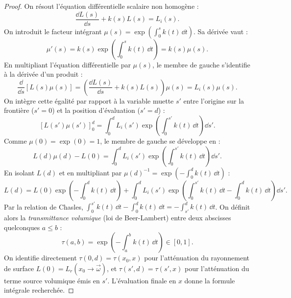 \begin{proof}
    On résout l'équation différentielle scalaire non homogène :
    \begin{equation}
        \frac{\dd L(s)}{\dd s} + k(s) L(s) = L_i(s).
    \end{equation}
    On introduit le facteur intégrant $\mu(s) = \exp\left( \int_0^s k(t) \, \dd t \right)$. Sa dérivée vaut :
    \begin{equation}
        \mu'(s) = k(s) \exp\left( \int_0^s k(t) \, \dd t \right) = k(s) \mu(s).
    \end{equation}
    En multipliant l'équation différentielle par $\mu(s)$, le membre de gauche s'identifie à la dérivée d'un produit :
    \begin{equation}
        \frac{\dd}{\dd s} \left[ L(s) \mu(s) \right] = \left( \frac{\dd L(s)}{\dd s} + k(s) L(s) \right) \mu(s) = L_i(s) \mu(s).
    \end{equation}
    On intègre cette égalité par rapport à la variable muette $s'$ entre l'origine sur la frontière ($s'=0$) et la position d'évaluation ($s'=d$) :
    \begin{equation}
        \left[ L(s') \mu(s') \right]_0^d = \int_0^d L_i(s') \exp\left( \int_0^{s'} k(t) \, \dd t \right) \dd s'.
    \end{equation}
    Comme $\mu(0) = \exp(0) = 1$, le membre de gauche se développe en :
    \begin{equation}
        L(d) \mu(d) - L(0) = \int_0^d L_i(s') \exp\left( \int_0^{s'} k(t) \, \dd t \right) \dd s'.
    \end{equation}
    En isolant $L(d)$ et en multipliant par $\mu(d)^{-1} = \exp\left( -\int_0^d k(t) \, \dd t \right)$ :
    \begin{equation}
        L(d) = L(0) \exp\left( -\int_0^d k(t) \, \dd t \right) + \int_0^d L_i(s') \exp\left( \int_0^{s'} k(t) \, \dd t - \int_0^d k(t) \, \dd t \right) \dd s'.
    \end{equation}
    Par la relation de Chasles, $\int_0^{s'} k(t) \, \dd t - \int_0^d k(t) \, \dd t = -\int_{s'}^d k(t) \, \dd t$. On définit alors la \emph{transmittance volumique} (loi de Beer-Lambert) entre deux abscisses quelconques $a \leqslant b$ :
    \begin{equation}
        \tau(a, b) = \exp\left( -\int_a^b k(t) \, \dd t \right) \in [0, 1].
    \end{equation}
    On identifie directement $\tau(0, d) = \tau(x_0, x)$ pour l'atténuation du rayonnement de surface $L(0) = L_r(x_0 \to \vec{\omega})$, et $\tau(s', d) = \tau(s', x)$ pour l'atténuation du terme source volumique émis en $s'$. L'évaluation finale en $x$ donne la formule intégrale recherchée.
\end{proof}

